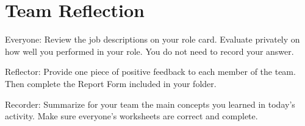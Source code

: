 
\section*{Team Reflection}

Everyone: Review the job descriptions on your role card.
Evaluate privately on how well you performed in your role.
You do not need to record your answer.

\vspace{1ex}

Reflector: Provide one piece of positive feedback to each member of the team.
Then complete the Report Form included in your folder.

\vspace{1ex}

Recorder: Summarize for your team the main concepts you learned in today's activity.
Make sure everyone's worksheets are correct and complete.
